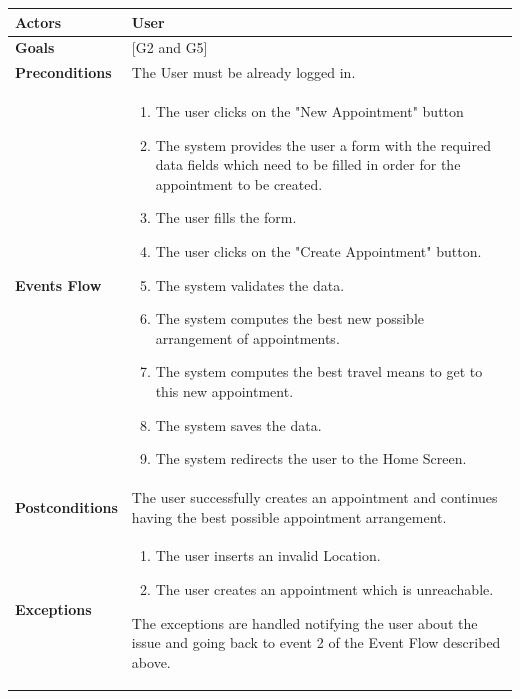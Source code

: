 \documentclass[12pt]{article}
\begin{document}
\begin{center}
    \begin{tabular} { |p{}|p{}| }
        \hline
        \textbf{Actors} & User \\ 
        \hline
        \textbf{Goals} & {[G2 and G5]} \\ 
        \hline  
        \textbf{Preconditions} & The User must be already logged in. \\ 
        \hline
        \textbf{Events Flow} & \begin{enumerate}[topsep=0pt] 
                            \setlength{\itemsep}{0.5pt}
                            \item The user clicks on the "New Appointment" button
                            \item The system provides the user a form with the required data fields which need to be filled in order for the appointment to be created.
                            \item The user fills the form.
                            \item The user clicks on the "Create Appointment" button.
                            \item The system validates the data.
                            \item The system computes the best new possible arrangement of appointments.
                            \item The system computes the best travel means to get to this new appointment.
                            \item The system saves the data.
                            \item The system redirects the user to the Home Screen.
                            \end{enumerate} \\
        \hline
        \textbf{Postconditions} & The user successfully creates an appointment and continues having the best possible appointment arrangement. \\
        \hline
        \textbf{Exceptions} & \begin{enumerate}[topsep=0pt] 
                            \setlength{\itemsep}{0.5pt}
                            \item The user inserts an invalid Location.
                            \item The user creates an appointment which is unreachable.
                            \end{enumerate} 
                            The exceptions are handled notifying the user about the issue and going back to event 2 of the Event Flow described above.\\ 
        \hline
    \end{tabular}
\end{center}
\end{document}
